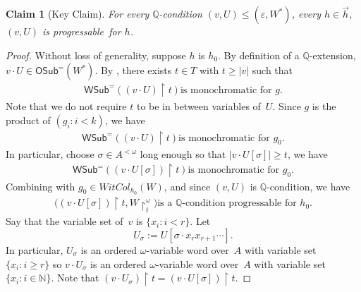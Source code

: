 \documentclass{article}
\def\uhr{\upharpoonright}
\def\wsamelong{\mathsf{WSub}^{=}}
\def\vwsamelong{\mathsf{OSub}^=}
\def\progressable{progressable}
\def\wc{WitCol}
\def\QQ{\mathbb{Q}}
\newcommand{\NN}[0]{\mathbb{N}}
\numberwithin{theorem}{section}
\newtheorem{claim}{Claim}
\theoremstyle{definition}
\begin{document}
\begin{claim}
[Key Claim]
\label{scaOVW-claim0}
For every $\QQ$-condition $(v,U)\leq (\varepsilon, W^*)$,
every $h\in\vec{h}$,
$(v,U)$ is \progressable\ for $h$.
\end{claim}
\begin{proof}
Without loss of generality, suppose $h$ is $h_0$.
By definition of a $\QQ$-extension, $v\cdot U\in \vwsamelong(W^*)$.
By , there exists $t\in T$
with $t\geq |v|$
such that
\begin{align}\nonumber
\wsamelong((v\cdot U)\uhr t)
\text{
is monochromatic for   $g $.
}
\end{align}
Note that we do not require $t$ to be in between variables of~$U$.
Since $g$ is the product of $(g_i: i<k)$,
we have 
\begin{align}\nonumber
\wsamelong((v\cdot U)\uhr t)
\text{
is monochromatic for   $g_0 $.
}
\end{align}
In particular, choose
$\sigma\in A^{<\omega}$ long enough so that
$|v\cdot U[\sigma]|\geq t$,
we have
\begin{align}\nonumber
\wsamelong((v\cdot U[\sigma])\uhr t)
\text{
is monochromatic for  $g_0 $.
}
\end{align}
Combining with $g_0\in\wc_{h_0}(W)$, and since $(v,U)$ is $\QQ$-condition,
we have
\begin{align}\label{scaOVW-eq5}
\text{$\big((v\cdot U[\sigma])\uhr t, W\uhr_t^\omega\big)$
is a $\QQ$-condition\ \progressable\ for $h_0$.}
\end{align}
Say that the variable set of~$v$ is $\{ x_i : i < r \}$.
Let $$U_\sigma:= U[\sigma\cdot x_r x_{r+1}\cdots].$$
In particular, $U_\sigma$ is an ordered $\omega$-variable word over~$A$ with variable set $\{ x_i : i \geq r \}$ so $v \cdot U_\sigma$ is an ordered $\omega$-variable word over~$A$ with variable set $\{ x_i : i \in \NN \}$.
Note that $(v\cdot U_\sigma)\uhr t = (v\cdot U[\sigma])\uhr t$.


\end{proof}
\end{document}
